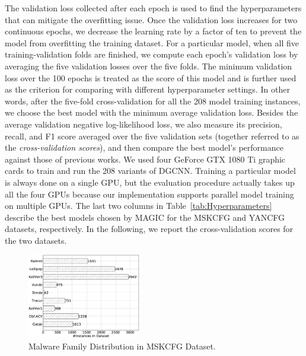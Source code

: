 The validation loss collected after each epoch is used to find the hyperparameters that can mitigate the overfitting issue. Once the validation loss increases for two continuous epochs,
we decrease the learning rate by a factor of ten to prevent the model from overfitting the training dataset.
For a particular model, when all five training-validation folds are finished, we compute each epoch's validation loss by averaging the five validation losses over the five folds.
The minimum validation loss over the 100 epochs is treated as the score of this model and is further used as the criterion for comparing with different hyperparameter settings.
In other words, after the five-fold cross-validation for all the 208 model training instances, we choose the best model with the minimum average validation loss.
Besides the average validation negative log-likelihood loss,
we also measure its precision, recall, and F1 score averaged over the five validation sets (together referred to as the \emph{cross-validation scores}), and then compare the best model's performance against those of previous works.
We used four GeForce GTX 1080 Ti graphic cards to train and run the 208 variants of DGCNN.
Training a particular model is always done on a single GPU,
but the evaluation procedure actually takes up all the four GPUs because our \sysname implementation supports parallel model training on multiple GPUs.
The last two columns in Table~\ref{tab:Hyperparameters} describe the best models chosen by MAGIC for the MSKCFG and YANCFG datasets, respectively.
In the following, we report the cross-validation scores for the two datasets.

\begin{figure}
\centerline{\includegraphics[width=0.44\textwidth]{Magic/figures/MsAcfgLabelDist.eps}}
\caption{Malware Family Distribution in MSKCFG Dataset.}
\label{fig:MSKCFGLabelDist}
\end{figure}

